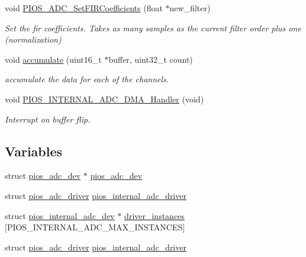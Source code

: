 \begin{DoxyCompactItemize}
void \hyperlink{group___p_i_o_s___a_d_c_gab2bb95efd8a061a377ae0d8cd60ca1ed}{\-P\-I\-O\-S\-\_\-\-A\-D\-C\-\_\-\-Set\-F\-I\-R\-Coefficients} (float $\ast$new\-\_\-filter)
\begin{DoxyCompactList}\small\item\em \-Set the fir coefficients. \-Takes as many samples as the current filter order plus one (normalization) \end{DoxyCompactList}\item 
void \hyperlink{group___p_i_o_s___a_d_c_ga7cf4581a50ff57300061ea450f87a007}{accumulate} (uint16\-\_\-t $\ast$buffer, uint32\-\_\-t count)
\begin{DoxyCompactList}\small\item\em accumulate the data for each of the channels. \end{DoxyCompactList}\item 
void \hyperlink{group___p_i_o_s___a_d_c_ga90fc0a6fd10259ceca76e89e41ab744a}{\-P\-I\-O\-S\-\_\-\-I\-N\-T\-E\-R\-N\-A\-L\-\_\-\-A\-D\-C\-\_\-\-D\-M\-A\-\_\-\-Handler} (void)
\begin{DoxyCompactList}\small\item\em \-Interrupt on buffer flip. \end{DoxyCompactList}\end{DoxyCompactItemize}
\subsection*{\-Variables}
\begin{DoxyCompactItemize}
\item 
struct \hyperlink{structpios__adc__dev}{pios\-\_\-adc\-\_\-dev} $\ast$ \hyperlink{group___p_i_o_s___a_d_c_gab32db3584e1b8779726fcabc7aa2dc9a}{pios\-\_\-adc\-\_\-dev}
\item 
struct \hyperlink{structpios__adc__driver}{pios\-\_\-adc\-\_\-driver} \hyperlink{group___p_i_o_s___a_d_c_gaa1decc30319efc11cab3d3e9ba32ff8e}{pios\-\_\-internal\-\_\-adc\-\_\-driver}
\item 
struct \hyperlink{structpios__internal__adc__dev}{pios\-\_\-internal\-\_\-adc\-\_\-dev} $\ast$ \hyperlink{group___p_i_o_s___a_d_c_ga5250ef3bb34ef47503a057a9b95c494a}{driver\-\_\-instances} \mbox{[}\-P\-I\-O\-S\-\_\-\-I\-N\-T\-E\-R\-N\-A\-L\-\_\-\-A\-D\-C\-\_\-\-M\-A\-X\-\_\-\-I\-N\-S\-T\-A\-N\-C\-E\-S\mbox{]}
\item 
struct \hyperlink{structpios__adc__driver}{pios\-\_\-adc\-\_\-driver} \hyperlink{group___p_i_o_s___a_d_c_gaa1decc30319efc11cab3d3e9ba32ff8e}{pios\-\_\-internal\-\_\-adc\-\_\-driver}
\end{DoxyCompactItemize}


